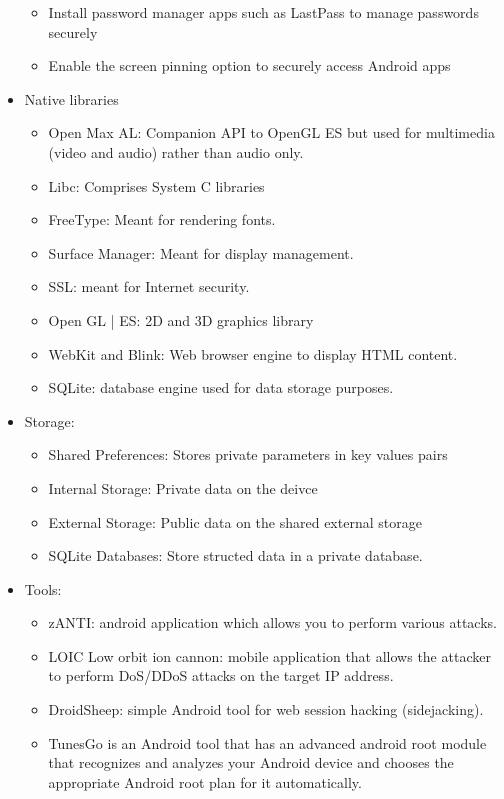 \begin{itemize}
\begin{itemize}
        \item Install password manager apps such as LastPass to manage passwords securely
        \item Enable the screen pinning option to securely access Android apps
    \end{itemize}
    \item Native libraries
    \begin{itemize}
        \item Open Max AL: Companion API to OpenGL ES but used for multimedia (video and audio) rather than audio only.
        \item Libc: Comprises System C libraries
        \item FreeType: Meant for rendering fonts.
        \item Surface Manager: Meant for display management.
        \item SSL: meant for Internet security.
        \item Open GL | ES: 2D and 3D graphics library
        \item WebKit and Blink: Web browser engine to display HTML content.
        \item SQLite: database engine used for data storage purposes.
    \end{itemize}
    \item Storage:
    \begin{itemize}
        \item Shared Preferences: Stores private parameters in key values pairs
        \item Internal Storage: Private data on the deivce
        \item External Storage: Public data on the shared external storage
        \item SQLite Databases: Store structed data in a private database.
    \end{itemize}
    \item Tools:
    \begin{itemize}
        \item zANTI: android application which allows you to perform various attacks.
        \item LOIC Low orbit ion cannon: mobile application that allows the attacker to perform DoS/DDoS attacks on the target IP address.
        \item DroidSheep: simple Android tool for web session hacking (sidejacking).
        \item TunesGo is an Android tool that has an advanced android root module that recognizes and analyzes your Android device and chooses the appropriate Android root plan for it automatically.

\end{itemize}
\end{itemize}
